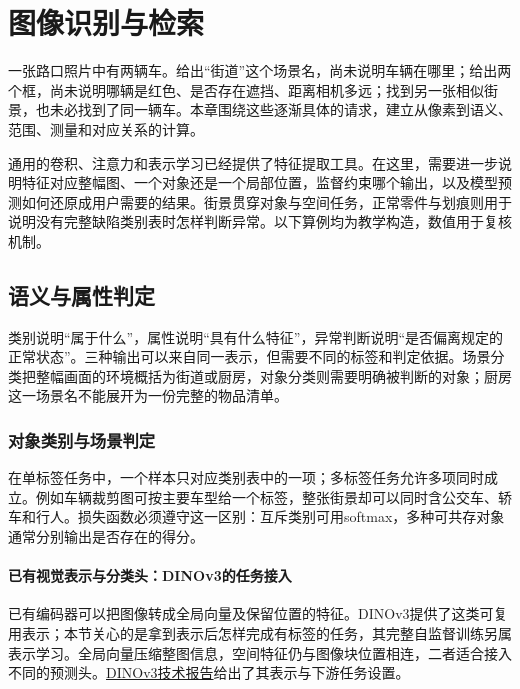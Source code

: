 \chapter{图像识别与检索}
\label{chap:vision-image-recognition}

一张路口照片中有两辆车。给出“街道”这个场景名，尚未说明车辆在哪里；给出两个框，尚未说明哪辆是红色、是否存在遮挡、距离相机多远；找到另一张相似街景，也未必找到了同一辆车。本章围绕这些逐渐具体的请求，建立从像素到语义、范围、测量和对应关系的计算。

通用的卷积、注意力和表示学习已经提供了特征提取工具。在这里，需要进一步说明特征对应整幅图、一个对象还是一个局部位置，监督约束哪个输出，以及模型预测如何还原成用户需要的结果。街景贯穿对象与空间任务，正常零件与划痕则用于说明没有完整缺陷类别表时怎样判断异常。以下算例均为教学构造，数值用于复核机制。

\section{语义与属性判定}
\label{sec:vision-recognition-semantics}

类别说明“属于什么”，属性说明“具有什么特征”，异常判断说明“是否偏离规定的正常状态”。三种输出可以来自同一表示，但需要不同的标签和判定依据。场景分类把整幅画面的环境概括为街道或厨房，对象分类则需要明确被判断的对象；厨房这一场景名不能展开为一份完整的物品清单。

\subsection{对象类别与场景判定}
\label{sec:vision-recognition-classification}

在单标签任务中，一个样本只对应类别表中的一项；多标签任务允许多项同时成立。例如车辆裁剪图可按主要车型给一个标签，整张街景却可以同时含公交车、轿车和行人。损失函数必须遵守这一区别：互斥类别可用softmax，多种可共存对象通常分别输出是否存在的得分。

\subsubsection{已有视觉表示与分类头：DINOv3的任务接入}
\label{sec:vision-recognition-dinov3}

已有编码器可以把图像转成全局向量及保留位置的特征。DINOv3提供了这类可复用表示；本节关心的是拿到表示后怎样完成有标签的任务，其完整自监督训练另属表示学习。全局向量压缩整图信息，空间特征仍与图像块位置相连，二者适合接入不同的预测头。\nocite{vision-2508-10104}\href{https://arxiv.org/abs/2508.10104}{DINOv3技术报告}给出了其表示与下游任务设置。

